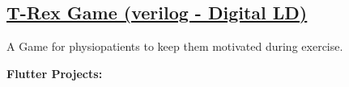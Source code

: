 \documentclass[]{m abbas resume' 2022}
\begin{document}
\begin{minipage}[t]{0.39\textwidth}
    \subsection{\href{https://github.com/smabbasht/CS370-DIgital-Logic-Design-Project}{\textbf{T-Rex Game (verilog - Digital LD)}}}%
    A Game for physiopatients to keep them motivated during exercise.
    

    \textbf{Flutter Projects:}\\
    
    
    
    

\end{minipage}
\end{document}
